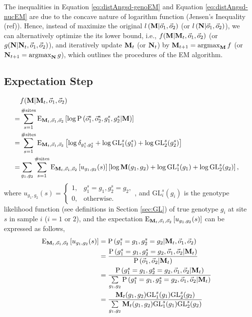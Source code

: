 \documentclass{article}
\DeclareMathOperator*{\argmax}{argmax}
\begin{document}
The inequalities in Equation \ref{eq:distAngsd-genoEM} and Equation \ref{eq:distAngsd-nucEM} are due to the concave nature of logarithm function (Jensen's Inequality (ref)). Hence, instead of maximize the original $l\left({\bf M}|\vec{o}_1,\vec{o}_2\right)$ (or $l\left({\bf N}|\vec{o}_1,\vec{o}_2\right)$), we can alternatively optimize the its lower bound, i.e., $f({\bf M}|{\bf M}_t,\vec{o}_1,\vec{o}_2)$ (or $g({\bf N}|{\bf N}_t,\vec{o}_1,\vec{o}_2)$), and iteratively update ${\bf M}_t$ (or ${\bf N}_t$) by ${\bf M}_{t+1}=\argmax_{{\bf M}}f$ (or ${\bf N}_{t+1}=\argmax_{{\bf N}}g$), which outlines the procedures of the EM algorithm.
\subsection{Expectation Step}
\begin{align}
&f({\bf M}|{\bf M}_{t},\vec{o}_1,\vec{o}_2)\nonumber\\
=&\sum_{s=1}^{\#\mathrm{sites}}\mathrm{E}_{{\bf M}_{t},\vec{o}_1,\vec{o}_2}\left[\log\mathrm{P}\left(\vec{o}_1^s,\vec{o}_2^s,g_1^s,g_2^s|{\bf M}\right)\right]\nonumber\\
=&\sum_{s=1}^{\#\mathrm{sites}}\mathrm{E}_{{\bf M}_{t},\vec{o}_1,\vec{o}_2}\left[\log\delta_{g_1^s,g_2^s}+\log\mathrm{GL}_1^s(g_1^s)+\log\mathrm{GL}_2^s(g_2^s)\right]\nonumber\\
=&\sum_{g_1,g_2}\sum_{s=1}^{\#\mathrm{sites}}\mathrm{E}_{{\bf M}_{t},\vec{o}_1,\vec{o}_2}\left[u_{g_1,g_2}(s)\right]\left[\log{\bf M}(g_1,g_2)+\log\mathrm{GL}_1^s(g_1)+\log\mathrm{GL}_2^s(g_2)\right],\label{eq:distAngsd-genoEStep}
\end{align}
where $u_{g_1,g_2}(s)=\left\{\begin{array}{cc}
   1,  & g_1^s=g_1, g_2^s=g_2,\\
   0,  & \mathrm{otherwise}.
\end{array}\right.$, and $\mathrm{GL}_i^s(g_i)$ is the genotype likelihood function (see definitions in Section \ref{sec:GL}) of true genotype $g_i$ at site $s$ in sample $i$ ($i=1$ or $2$), and the expectation $\mathrm{E}_{{\bf M}_{t},\vec{o}_1,\vec{o}_2}\left[u_{g_1,g_2}(s)\right]$ can be expressed as follows,
\begin{align*}
    \mathrm{E}_{{\bf M}_{t},\vec{o}_1,\vec{o}_2}\left[u_{g_1,g_2}(s)\right]&=\mathrm{P}\left(g_1^s=g_1, g_2^s=g_2|{\bf M}_{t},\vec{o}_1,\vec{o}_2\right)\\
    &=\frac{\mathrm{P}\left(g_1^s=g_1, g_2^s=g_2,\vec{o}_1,\vec{o}_2|{\bf M}_{t}\right)}{\mathrm{P}\left(\vec{o}_1,\vec{o}_2|{\bf M}_{t}\right)}\\
    &=\frac{\mathrm{P}\left(g_1^s=g_1, g_2^s=g_2,\vec{o}_1,\vec{o}_2|{\bf M}_{t}\right)}{\sum\limits_{g_1,g_2}\mathrm{P}\left(g_1^s=g_1, g_2^s=g_2,\vec{o}_1,\vec{o}_2|{\bf M}_{t}\right)}\\
    &=\frac{{\bf M}_{t}(g_1,g_2)\mathrm{GL}_1^s(g_1)\mathrm{GL}_2^s(g_2)}{\sum\limits_{g_1,g_2}{\bf M}_{t}(g_1,g_2)\mathrm{GL}_1^s(g_1)\mathrm{GL}_2^s(g_2)}
\end{align*}
\end{document}
